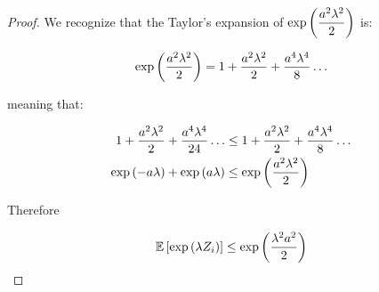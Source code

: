 \begin{proof}
We recognize that the Taylor's expansion of $\exp\left(\dfrac{a^2\lambda^2}{2}\right)$ is:

\begin{align*}
\exp\left(\dfrac{a^2\lambda^2}{2}\right) = 1 + \dfrac{a^2 \lambda^2}{2} + \dfrac{a^4 \lambda^4}{8}\ldots
\end{align*}

meaning that:

\begin{align*}
1 + \dfrac{a^2 \lambda^2}{2} + \dfrac{a^4 \lambda^4}{24}\ldots
& \leq
1 + \dfrac{a^2 \lambda^2}{2} + \dfrac{a^4 \lambda^4}{8}\ldots\\
\exp\left( -a \lambda\right) + \exp\left(a \lambda\right) &\leq \exp\left(\dfrac{a^2\lambda^2}{2}\right)\\ 
\end{align*}

Therefore

\begin{align*}
\mathbb{E}\left[\exp\left(\lambda Z_i\right)\right] \leq \exp\left(\frac{\lambda^2 a^2}{2}\right)
\end{align*}
\end{proof}